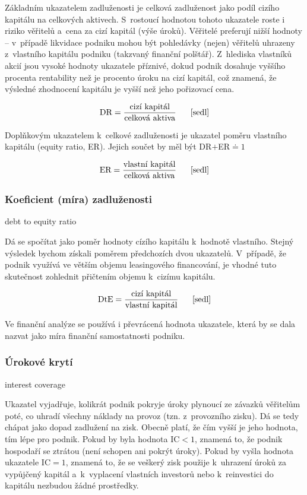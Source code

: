 Základním ukazatelem zadluženosti je celková zadluženost jako podíl cizího kapitálu na celkových aktivech. S~rostoucí hodnotou tohoto ukazatele roste i riziko věřitelů a~cena za cizí kapitál (výše úroků). Věřitelé preferují nižší hodnoty -- v~případě likvidace podniku mohou být pohledávky (nejen) věřitelů uhrazeny z~vlastního kapitálu podniku (takzvaný finanční polštář).
Z~hlediska vlastníků akcií jsou vysoké hodnoty ukazatele příznivé, dokud podnik dosahuje vyššího procenta rentability než je procento úroku na cizí kapitál, což znamená, že výsledné zhodnocení kapitálu je vyšší než jeho pořizovací cena\cite{such}. 

$$\vz{DR}{cizí kapitál}{celková aktiva} \scite{sedl}$$

\vspace{3mm}
Doplňkovým ukazatelem k~celkové zadluženosti je ukazatel poměru vlastního kapitálu (equity ratio, ER). Jejich součet by měl být DR$+$ER$
\doteq 1$

$$\vz{ER}{vlastní kapitál}{celková aktiva} \scite{sedl}$$

\subsubsection{Koeficient (míra) zadluženosti}
debt to equity ratio

Dá se spočítat jako poměr hodnoty cízího kapitálu k~hodnotě vlastního. Stejný výsledek bychom získali poměrem předchozích dvou ukazatelů. V~případě, že podnik využívá ve větším objemu leasingového financování, je vhodné tuto skutečnost zohlednit přičtením objemu k~cizímu kapitálu. 

$$\vz{DtE}{cizí kapitál}{vlastní kapitál} \scite{sedl}$$

\vspace{3mm}
Ve finanční analýze se používá i převrácená hodnota ukazatele, která by se dala nazvat jako míra finanční samostatnosti podniku.

\subsubsection{Úrokové krytí}
interest coverage

Ukazatel vyjadřuje, kolikrát podnik pokryje úroky plynoucí ze závazků věřitelům poté, co uhradí všechny náklady na provoz (tzn. z~provozního zisku). Dá se tedy chápat jako dopad zadlužení na zisk. Obecně platí, že čím vyšší je jeho hodnota, tím lépe pro podnik. Pokud by byla hodnota IC$<1$, znamená to, že podnik hospodaří se ztrátou (není schopen ani pokrýt úroky). Pokud by vyšla hodnota ukazatele IC$=1$, znamená to, že se veškerý zisk použije k~uhrazení úroků za vypůjčený kapitál a~k~vyplacení vlastních investorů nebo k~reinvestici do kapitálu nezbudou žádné prostředky.

